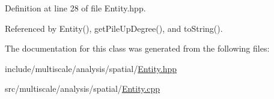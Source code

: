 Definition at line 28 of file Entity.\-hpp.



Referenced by Entity(), get\-Pile\-Up\-Degree(), and to\-String().



The documentation for this class was generated from the following files\-:\begin{DoxyCompactItemize}
\item 
include/multiscale/analysis/spatial/\hyperlink{Entity_8hpp}{Entity.\-hpp}\item 
src/multiscale/analysis/spatial/\hyperlink{Entity_8cpp}{Entity.\-cpp}\end{DoxyCompactItemize}
